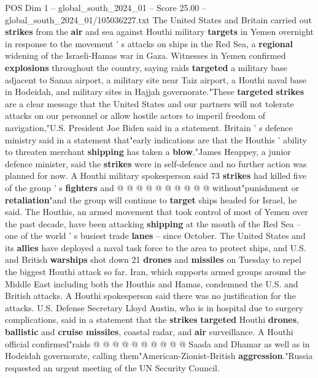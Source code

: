\begin{textsample}{POS Dim 1 – global\_south\_2024\_01 – Score 25.00 – global\_south\_2024\_01/105036227.txt}  \label{ex:f1_pos_103}
The United States and Britain carried out \textbf{strikes} from the \textbf{air} and sea against Houthi military \textbf{targets} in Yemen overnight in response to the movement ' s attacks on ships in the Red Sea, a \textbf{regional} widening of the Israeli-Hamas war in Gaza.
Witnesses in Yemen confirmed \textbf{explosions} throughout the country, saying raids \textbf{targeted} a military base adjacent to Sanaa airport, a military site near Taiz airport, a Houthi naval base in Hodeidah, and military sites in Hajjah governorate."These \textbf{targeted} \textbf{strikes} are a clear message that the United States and our partners will not tolerate attacks on our personnel or allow hostile actors to imperil freedom of navigation,"U.S.
President Joe Biden said in a statement.
Britain ' s defence ministry said in a statement that"early indications are that the Houthis ' ability to threaten merchant \textbf{shipping} has taken a \textbf{blow}."James Heappey, a junior defence minister, said the \textbf{strikes} were in self-defence and no further action was planned for now.
A Houthi military spokesperson said 73 \textbf{strikes} had killed five of the group ' s \textbf{fighters} and @ @ @ @ @ @ @ @ @ @ without"punishment or \textbf{retaliation}"and the group will continue to \textbf{target} ships headed for Israel, he said.
The Houthis, an armed movement that took control of most of Yemen over the past decade, have been attacking \textbf{shipping} at the mouth of the Red Sea -- one of the world ' s busiest trade \textbf{lanes} -- since October.
The United States and its \textbf{allies} have deployed a naval task force to the area to protect ships, and U.S. and British \textbf{warships} shot down 21 \textbf{drones} and \textbf{missiles} on Tuesday to repel the biggest Houthi attack so far.
Iran, which supports armed groups around the Middle East including both the Houthis and Hamas, condemned the U.S. and British attacks.
A Houthi spokesperson said there was no justification for the attacks.
U.S.
Defense Secretary Lloyd Austin, who is in hospital due to surgery complications, said in a statement that the \textbf{strikes} \textbf{targeted} Houthi \textbf{drones}, \textbf{ballistic} and \textbf{cruise} \textbf{missiles}, coastal radar, and \textbf{air} surveillance.
A Houthi official confirmed"raids @ @ @ @ @ @ @ @ @ @ Saada and Dhamar as well as in Hodeidah governorate, calling them"American-Zionist-British \textbf{aggression}."Russia requested an urgent meeting of the UN Security Council.

\end{textsample}
